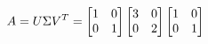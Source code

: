 \documentclass[preview]{standalone}
\begin{document}
\begin{align*}
\special{dvisvgm:raw <g id='unique000'>}A = U \Sigma V^T = \begin{bmatrix}1 & 0\\0 & 1\end{bmatrix}\begin{bmatrix}3 & 0\\0 & 2\end{bmatrix}\begin{bmatrix}1 & 0\\0 & 1\end{bmatrix}\special{dvisvgm:raw </g>}
\end{align*}
\end{document}
